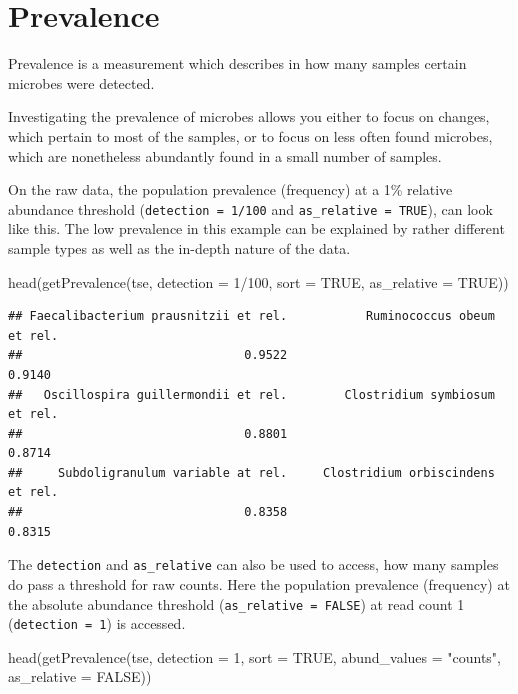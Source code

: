 \documentclass[
]{book}
\newenvironment{Shaded}{\begin{snugshade}}{\end{snugshade}}
\newcommand{\AttributeTok}[1]{\textcolor[rgb]{0.77,0.63,0.00}{#1}}
\newcommand{\ConstantTok}[1]{\textcolor[rgb]{0.00,0.00,0.00}{#1}}
\newcommand{\DecValTok}[1]{\textcolor[rgb]{0.00,0.00,0.81}{#1}}
\newcommand{\FunctionTok}[1]{\textcolor[rgb]{0.00,0.00,0.00}{#1}}
\newcommand{\NormalTok}[1]{#1}
\newcommand{\SpecialCharTok}[1]{\textcolor[rgb]{0.00,0.00,0.00}{#1}}
\newcommand{\StringTok}[1]{\textcolor[rgb]{0.31,0.60,0.02}{#1}}
\begin{document}
\hypertarget{prevalence}{%
\section{Prevalence}\label{prevalence}}

Prevalence is a measurement which describes in how many samples certain
microbes were detected.

Investigating the prevalence of microbes allows you either to focus on changes,
which pertain to most of the samples, or to focus on less often found microbes,
which are nonetheless abundantly found in a small number of samples.

On the raw data, the population prevalence (frequency) at a 1\% relative
abundance threshold (\texttt{detection\ =\ 1/100} and \texttt{as\_relative\ =\ TRUE}), can look
like this. The low prevalence in this example can be explained by rather
different sample types as well as the in-depth nature of the data.

\begin{Shaded}
\begin{Highlighting}[]
\FunctionTok{head}\NormalTok{(}\FunctionTok{getPrevalence}\NormalTok{(tse, }\AttributeTok{detection =} \DecValTok{1}\SpecialCharTok{/}\DecValTok{100}\NormalTok{, }\AttributeTok{sort =} \ConstantTok{TRUE}\NormalTok{, }\AttributeTok{as\_relative =} \ConstantTok{TRUE}\NormalTok{))}
\end{Highlighting}
\end{Shaded}

\begin{verbatim}
## Faecalibacterium prausnitzii et rel.           Ruminococcus obeum et rel. 
##                               0.9522                               0.9140 
##   Oscillospira guillermondii et rel.        Clostridium symbiosum et rel. 
##                               0.8801                               0.8714 
##     Subdoligranulum variable at rel.     Clostridium orbiscindens et rel. 
##                               0.8358                               0.8315
\end{verbatim}

The \texttt{detection} and \texttt{as\_relative} can also be used to access, how many samples
do pass a threshold for raw counts. Here the population prevalence (frequency)
at the absolute abundance threshold (\texttt{as\_relative\ =\ FALSE}) at read count 1
(\texttt{detection\ =\ 1}) is accessed.

\begin{Shaded}
\begin{Highlighting}[]
\FunctionTok{head}\NormalTok{(}\FunctionTok{getPrevalence}\NormalTok{(tse, }\AttributeTok{detection =} \DecValTok{1}\NormalTok{, }\AttributeTok{sort =} \ConstantTok{TRUE}\NormalTok{, }\AttributeTok{abund\_values =} \StringTok{"counts"}\NormalTok{,}
                   \AttributeTok{as\_relative =} \ConstantTok{FALSE}\NormalTok{))}
\end{Highlighting}
\end{Shaded}
\end{document}
